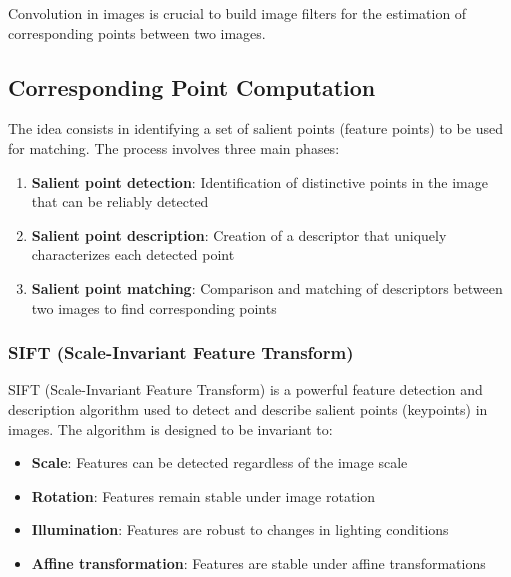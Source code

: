 \documentclass[11pt,a4paper]{article}
\theoremstyle{definition}
\theoremstyle{plain}
\theoremstyle{remark}
\begin{document}
Convolution in images is crucial to build image filters for the estimation of corresponding points between two images.

\subsection{Corresponding Point Computation}

\begin{tcolorbox}[colback=teal!5!white,colframe=teal!75!black,title=\textbf{Feature Matching Pipeline}]
The idea consists in identifying a set of salient points (feature points) to be used for matching. The process involves three main phases:
\begin{enumerate}
    \item \textbf{Salient point detection}: Identification of distinctive points in the image that can be reliably detected
    \item \textbf{Salient point description}: Creation of a descriptor that uniquely characterizes each detected point
    \item \textbf{Salient point matching}: Comparison and matching of descriptors between two images to find corresponding points
\end{enumerate}
\end{tcolorbox}

\subsubsection{SIFT (Scale-Invariant Feature Transform)}

\begin{tcolorbox}[colback=blue!5!white,colframe=blue!75!black,title=\textbf{SIFT Overview}]
SIFT (Scale-Invariant Feature Transform) is a powerful feature detection and description algorithm used to detect and describe salient points (keypoints) in images. The algorithm is designed to be invariant to:
\begin{itemize}
    \item \textbf{Scale}: Features can be detected regardless of the image scale
    \item \textbf{Rotation}: Features remain stable under image rotation
    \item \textbf{Illumination}: Features are robust to changes in lighting conditions
    \item \textbf{Affine transformation}: Features are stable under affine transformations
\end{itemize}
\end{tcolorbox}
\end{document}
